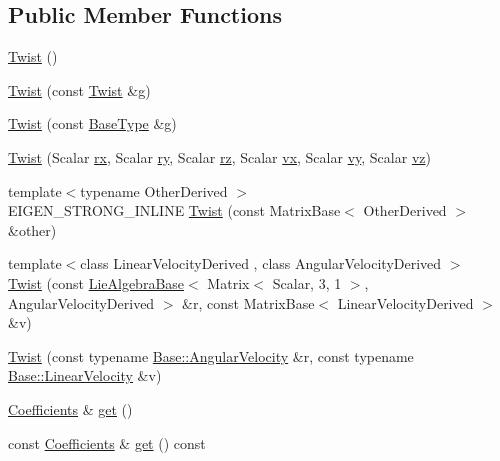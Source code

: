 \subsection*{Public Member Functions}
\begin{DoxyCompactItemize}
\item 
\hyperlink{class_twist_a1591bb5cbaf556a1315950e4b27a50cf}{Twist} ()
\item 
\hyperlink{class_twist_a6d27b4287aff94955d46b3f76151f119}{Twist} (const \hyperlink{class_twist}{Twist} \&g)
\item 
\hyperlink{class_twist_a4b460b4e069b959f7fd2f0d01fdf4703}{Twist} (const \hyperlink{class_twist_ab1df1af2243738177191f6c23123f3be}{Base\+Type} \&g)
\item 
\hyperlink{class_twist_adf2846cc99f0b092b4ab622a00177363}{Twist} (Scalar \hyperlink{class_twist_base_a894919d086a24def57622d7e151a58c2}{rx}, Scalar \hyperlink{class_twist_base_a649f10b163fa68cd901aa3ee412ced7f}{ry}, Scalar \hyperlink{class_twist_base_a25f415854bcf537c8aa1cc244bfdb770}{rz}, Scalar \hyperlink{class_twist_base_a323021f263783da2d5b275552858ab67}{vx}, Scalar \hyperlink{class_twist_base_a2cf70ed359f60d07610e8ab36910f436}{vy}, Scalar \hyperlink{class_twist_base_a217ab4d995e5c40b24a586278301415e}{vz})
\item 
{\footnotesize template$<$typename Other\+Derived $>$ }\\E\+I\+G\+E\+N\+\_\+\+S\+T\+R\+O\+N\+G\+\_\+\+I\+N\+L\+I\+NE \hyperlink{class_twist_ace92bbcbb4ccc4da3bf3f98c2463aca6}{Twist} (const Matrix\+Base$<$ Other\+Derived $>$ \&other)
\item 
{\footnotesize template$<$class Linear\+Velocity\+Derived , class Angular\+Velocity\+Derived $>$ }\\\hyperlink{class_twist_ac948ffd308a2af9bb8fbd68cda5e1331}{Twist} (const \hyperlink{class_lie_algebra_base}{Lie\+Algebra\+Base}$<$ Matrix$<$ Scalar, 3, 1 $>$, Angular\+Velocity\+Derived $>$ \&r, const Matrix\+Base$<$ Linear\+Velocity\+Derived $>$ \&v)
\item 
\hyperlink{class_twist_a6be65e5ed24f7aa0b2ac0261aa111292}{Twist} (const typename \hyperlink{class_twist_base_ad0bc13debe8afc170da877cebe4dc45f}{Base\+::\+Angular\+Velocity} \&r, const typename \hyperlink{class_twist_base_aeafbc7a3ca37e08812be0af7e680190b}{Base\+::\+Linear\+Velocity} \&v)
\item 
\hyperlink{class_twist_a1bc0976a0f06b366421639350134222b}{Coefficients} \& \hyperlink{class_twist_ac1f779976c880605099c319bc9749c2c}{get} ()
\item 
const \hyperlink{class_twist_a1bc0976a0f06b366421639350134222b}{Coefficients} \& \hyperlink{class_twist_a92329266374466e60daabe5ca6c2dcbe}{get} () const
\end{DoxyCompactItemize}
